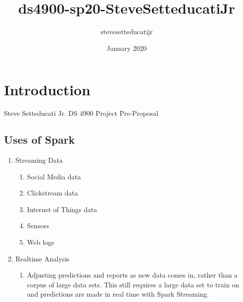 \documentclass{article}
\title{ds4900-sp20-SteveSetteducatiJr}
\author{stevesetteducatijr }
\date{January 2020}
\begin{document}
\maketitle

\section{Introduction}
Steve Setteducati Jr.
DS 4900 Project Pre-Proposal
\subsection{Uses of Spark}
\begin{enumerate}
    \item Streaming Data
    \begin{enumerate}
        \item Social Media data
        \item Clickstream data
        \item Internet of Things data
        \item Sensors
        \item Web logs
    \end{enumerate}
    \item Realtime Analysis
    \begin{enumerate}
        \item Adjusting predictions and reports as new data comes in, rather than a corpus of large data sets. This still requires a large data set to train on and predictions are made in real time with Spark Streaming.
    \end{enumerate}
\end{enumerate}
    
\end{document}
